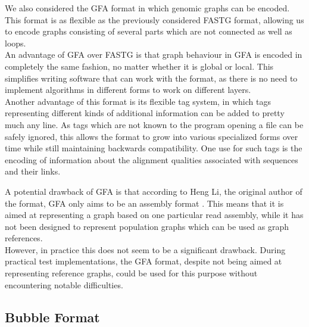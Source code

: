 \documentclass[a4paper,12pt,twoside,BCOR=10mm]{scrbook}
\begin{document}
We also considered the GFA format in which genomic graphs can be encoded. 
This format is as flexible as the previously considered FASTG format, allowing us to encode graphs consisting of 
several parts which are not connected as well as loops. \\
An advantage of GFA over FASTG is that 
graph behaviour in GFA is encoded in completely the same fashion, no matter whether it is global 
or local. This simplifies writing software that can work with the format, 
as there is no need to implement algorithms in different forms to work on 
different layers. \\
Another advantage of this format is its flexible tag system, in which tags representing different kinds of 
additional information can be added to pretty much any line. As tags which are not known to the program 
opening a file can be safely ignored, this allows the format to grow into various specialized forms over 
time while still maintaining backwards compatibility. 
One use for such tags is the encoding of information about the alignment qualities associated with sequences and their links.

A potential drawback of GFA is that 
according to Heng Li, the original author of the format, GFA only aims to be an assembly format \citep{specGFA3}.
This means that it is aimed at representing a graph based on one particular read assembly, 
while it has not been designed to represent population graphs which can be used as graph references. \\
However, in practice this does not seem to be a significant drawback. 
During practical test implementations, the GFA format, despite not being aimed at representing reference graphs, 
could be used for this purpose without encountering notable difficulties.

\subsection{Bubble Format}
\end{document}
